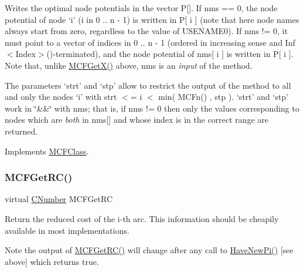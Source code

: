 Writes the optimal node potentials in the vector P\mbox{[}\mbox{]}. If nms == 0, the node potential of node `i' (i in 0 .. n -\/ 1) is written in P\mbox{[} i \mbox{]} (note that here node names always start from zero, regardless to the value of U\+S\+E\+N\+A\+M\+E0). If nms != 0, it must point to a vector of indices in 0 .. n -\/ 1 (ordered in increasing sense and Inf$<$\+Index$>$()-\/terminated), and the node potential of nms\mbox{[} i \mbox{]} is written in P\mbox{[} i \mbox{]}. Note that, unlike \mbox{\hyperlink{class_m_c_f_class_a4eb307e0707adaef99bb0e08c9e10eb8}{M\+C\+F\+Get\+X()}} above, nms is an {\itshape input} of the method.

The parameters `strt' and `stp' allow to restrict the output of the method to all and only the nodes `i' with strt $<$= i $<$ min( M\+C\+Fn() , stp ). `strt' and `stp' work in \char`\"{}\&\&\char`\"{} with nms; that is, if nms != 0 then only the values corresponding to nodes which are {\itshape both} in nms\mbox{[}\mbox{]} and whose index is in the correct range are returned. 

Implements \mbox{\hyperlink{class_m_c_f_class_a8c573c04800332c86ea31aeb80bbd7b1}{M\+C\+F\+Class}}.

\mbox{\label{class_m_c_f_simplex_a7c103b582c910ccfda354032aae5722e}} 
\subsubsection{\texorpdfstring{M\+C\+F\+Get\+R\+C()}{MCFGetRC()}\hspace{0.1cm}{\footnotesize\ttfamily [1/5]}}
{\footnotesize\ttfamily virtual \mbox{\hyperlink{class_m_c_f_class_a24d0627ba8213afe1ec4ebeb4508e8f1}{C\+Number}} M\+C\+F\+Get\+RC}

Return the reduced cost of the i-\/th arc. This information should be cheapily available in most implementations.

\begin{DoxyNote}{Note}
the output of \mbox{\hyperlink{class_m_c_f_class_af027cee8179a876a4879c73820c380d1}{M\+C\+F\+Get\+R\+C()}} will change after any call to \mbox{\hyperlink{class_m_c_f_class_a87b2b6516a7874ac55145312bd2d55bb}{Have\+New\+Pi()}} \mbox{[}see above\mbox{]} which returns true. 
\end{DoxyNote}
\mbox{\label{class_m_c_f_simplex_a361d84ae42041fdbf3824d45fc4c54aa}} 
